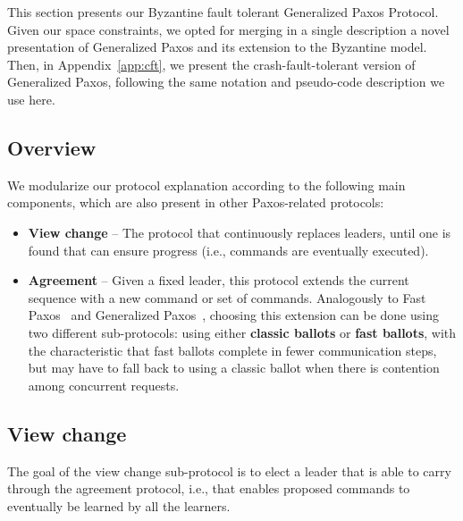 This section presents our Byzantine fault tolerant Generalized Paxos
Protocol. Given our space constraints, we opted for merging in a
single description a novel presentation of Generalized Paxos and its
extension to the Byzantine model. Then, in Appendix~\ref{app:cft}, we
present the crash-fault-tolerant version of Generalized Paxos,
following the same notation and pseudo-code description we use here.

\subsection{Overview}

We modularize our protocol explanation according to the following main components, which are also present in other Paxos-related protocols:

\begin{itemize}

\item
{\bf View change} -- The protocol that continuously replaces leaders, until one is found that can ensure progress (i.e., commands are eventually executed).

\item
{\bf Agreement} -- Given a fixed leader, this protocol extends the current sequence with a new command or set of commands. Analogously to Fast Paxos~\cite{fast:paxos} and Generalized Paxos~\cite{generalized:paxos}, choosing this extension can be done using two different sub-protocols: using either {\bf classic ballots} or {\bf fast ballots}, with the characteristic that fast ballots complete in fewer communication steps, but may have to fall back to using a classic ballot when there is contention among concurrent requests.

\end{itemize}

\subsection{View change} 

The goal of the view change sub-protocol is to elect a leader that is able to carry through the agreement protocol, i.e., that enables proposed commands to eventually be learned by all the learners.

